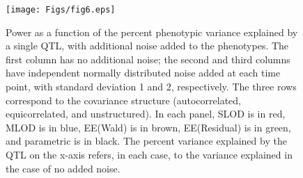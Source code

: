 \documentclass[12pt,letterpaper]{article}
\begin{document}
\newpage

\begin{figure}[!ht]
\begin{center}
\texttt{[image: Figs/fig6.eps]}
\vspace{1cm}
\caption{\label{power2}
  Power as a function of the percent phenotypic variance explained by
  a single QTL, with additional noise added to the phenotypes.  The
  first column has no additional noise; the second and third columns
  have independent normally distributed noise added at each time
  point, with standard deviation 1 and 2, respectively.  The three
  rows correspond to the covariance structure (autocorrelated,
  equicorrelated, and unstructured).  In each panel, SLOD is in red,
  MLOD is in blue, EE(Wald) is in brown, EE(Residual) is in green, and
  parametric is in black. The percent variance explained by the QTL
  on the x-axis refers, in each case, to the variance explained in the
  case of no added noise.}
\end{center}
\end{figure}
\end{document}
